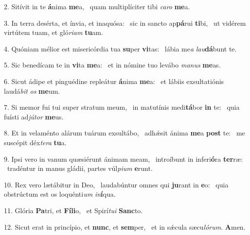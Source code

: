 2. Sitívit in te \textbf{á}nima \textbf{me}a, \ast\  quam multiplíciter tibi \textit{ca}\textit{ro} \textbf{me}a.\

3. In terra desérta, et ínvia, et inaquósa: \dag\  sic in sancto ap\textbf{pá}rui \textbf{ti}bi, \ast\  ut vidérem virtútem tuam, et gló\textit{ri}\textit{am} \textbf{tu}am.\

4. Quóniam mélior est misericórdia tua \textbf{su}per \textbf{vi}tas: \ast\  lábia me\textit{a} \textit{lau}\textbf{dá}bunt te.\

5. Sic benedícam te in \textbf{vi}ta \textbf{me}a: \ast\  et in nómine tuo levábo \textit{ma}\textit{nus} \textbf{me}as.\

6. Sicut ádipe et pinguédine repleátur \textbf{á}nima \textbf{me}a: \ast\  et lábiis exsultatiónis laudá\textit{bit} \textit{os} \textbf{me}um.\

7. Si memor fui tui super stratum meum, \dag\  in matutínis medi\textbf{tá}bor \textbf{in} te: \ast\  quia fuísti ad\textit{jú}\textit{tor} \textbf{me}us.\

8. Et in velaménto alárum tuárum exsultábo, \dag\  adhǽsit ánima \textbf{me}a \textbf{post} te: \ast\  me suscépit déx\textit{te}\textit{ra} \textbf{tu}a.\

9. Ipsi vero in vanum quæsiérunt ánimam meam, \dag\  introíbunt in inferi\textbf{ó}ra \textbf{ter}ræ: \ast\  tradéntur in manus gládii, partes vúl\textit{pi}\textit{um} \textbf{e}runt.\

10. Rex vero lætábitur in Deo, \dag\  laudabúntur omnes qui \textbf{ju}rant in \textbf{e}o: \ast\  quia obstrúctum est os loquénti\textit{um} \textit{in}\textbf{í}qua.\

11. Glória \textbf{Pa}tri, et \textbf{Fí}\textbf{li}o, \ast\  et Spirí\textit{tu}\textit{i} \textbf{Sanc}to.\

12. Sicut erat in princípio, et \textbf{nunc}, et \textbf{sem}per, \ast\  et in sǽcula sæcu\textit{ló}\textit{rum}. \textbf{A}men.\

